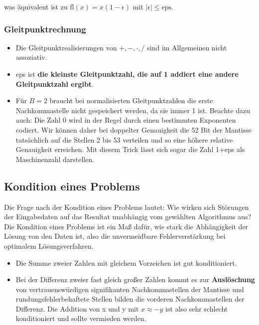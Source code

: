 \documentclass[a4paper]{article}
\begin{document}
was äquivalent ist zu $\mathrm{fl}(x) = x (1 - \epsilon)$
\hspace{1em}
mit $|\epsilon| \le \mathrm{eps}$.

\subsubsection{Gleitpunktrechnung}

\begin{itemize}
    \item Die Gleitpunktrealisierungen von $+, -, \cdot, /$ sind im Allgemeinen
    nicht assoziativ.
    \item eps ist \textbf{die kleinste Gleitpunktzahl, die auf 1 addiert eine
    andere Gleitpunktzahl ergibt}.
    \item Für $B = 2$ braucht bei normalisierten Gleitpunktzahlen die erste
    Nachkommastelle nicht gespeichert werden, da sie immer 1 ist. Beachte dazu
    auch: Die Zahl 0 wird in der Regel durch einen bestimmten Exponenten
    codiert. Wir können daher bei doppelter Genauigkeit die 52 Bit der Mantisse
    tatsächlich auf die Stellen 2 bis 53 verteilen und so eine höhere relative
    Genauigkeit erreichen. Mit diesem Trick lässt sich sogar die Zahl 1+eps als
    Maschinenzahl darstellen.
\end{itemize}

\subsection{Kondition eines Problems}

Die Frage nach der Kondition eines Problems lautet: Wie wirken sich Störungen
der Eingabedaten auf das Resultat unabhängig vom gewählten Algorithmus aus? Die
Kondition eines Problems ist ein Maß dafür, wie stark die Abhängigkeit der
Lösung von den Daten ist, also die unvermeidbare Fehlerverstärkung bei optimalem
Lösungsverfahren.

\begin{itemize}
    \item Die Summe zweier Zahlen mit gleichem Vorzeichen ist gut konditioniert.
    \item Bei der Differenz zweier fast gleich großer Zahlen kommt es zur
    \textbf{Auslöschung} von vertrauenswürdigen signifikanten Nachkommastellen
    der Mantisse und rundungsfehlerbehaftete Stellen bilden die vorderen
    Nachkommastellen der Differenz. Die Addition von x und y mit $x \approx -y$
    ist also sehr schlecht konditioniert und sollte vermieden werden.
\end{itemize}
\end{document}
